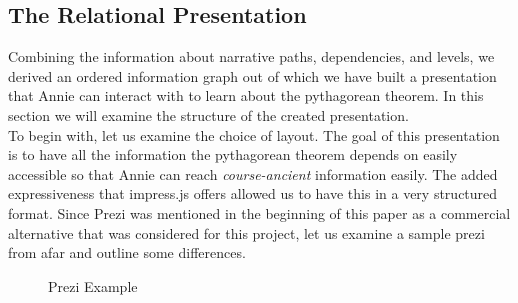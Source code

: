 \documentclass[twoside, 12pt]{article}
\begin{document}
\begin{figure}
\vspace{-50pt}
\end{figure}

\subsection{The Relational Presentation}
\label{sec:RelationalPresentations}

Combining the information about narrative paths, dependencies, and levels, we derived an ordered information graph out of which we have built a presentation that Annie can interact with to learn about the pythagorean theorem. In this section we will examine the structure of the created presentation.\\

To begin with, let us examine the choice of layout. The goal of this presentation is to have all the information the pythagorean theorem depends on easily accessible so that Annie can reach \textit{course-ancient} information easily. The added expressiveness that impress.js offers allowed us to have this in a very structured format. Since Prezi was mentioned in the beginning of this paper as a commercial alternative that was considered for this project, let us examine a sample prezi from afar and outline some differences.\\

\begin{figure}
\vspace{-26pt}
  \begin{center}
\vspace{-5pt}
  \caption{Prezi Example \cite{npentrel2:npentrel15}}
  \label{fig:preziExample}
\vspace{-24pt}
  \end{center}
\end{figure}
\end{document}

